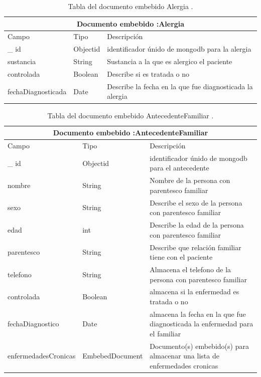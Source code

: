 	
	
\begin{table}[htb]
	\centering
	\begin{tabular}{| p{3.5cm}| p{3.0cm} | p{9.8cm} |}
	\hline
	\multicolumn{3}{|c|}{Documento embebido :Alergia} \\
	\hline
	Campo & Tipo &  Descripción\\ \hline
	
	\_ id & Objectid &identificador únido de mongodb para la alergia \\ \hline
	sustancia & String & Sustancia a la que es alergico el paciente \\ \hline
	controlada & Boolean & Describe si es tratada o no \\ \hline 
	fechaDiagnosticada & Date & Describe la fecha en la que fue diagnosticada la alergia \\ \hline

	
	\end{tabular}
	\caption{Tabla del documento embebido Alergia .}
	\label{tabla:diccionarioDatos}
	\end{table}

\begin{table}[htb]
	\centering
	\begin{tabular}{| p{3.5cm}| p{3.0cm} | p{9.8cm} |}
	\hline
	\multicolumn{3}{|c|}{Documento embebido :AntecedenteFamiliar} \\
	\hline
	Campo & Tipo &  Descripción\\ \hline
	
	\_ id & Objectid &identificador únido de mongodb para el antecedente \\ \hline
	
	nombre & String & Nombre de la persona con parentesco familiar  \\ \hline
	
	sexo &  String & Describe el sexo de la persona con parentesco familiar \\ \hline
	
	edad & int & Describe la edad de la persona con parentesco familiar \\ \hline
	
	parentesco & String & Describe que relación familiar tiene con el paciente \\ \hline
	
	telefono & String & Almacena el telefono de la persona con parentesco familiar \\ \hline
	
	controlada & Boolean & almacena si la enfermedad es tratada o no \\ \hline
	
	fechaDiagnostico & Date  & almacena la fecha en la que fue diagnosticada la enfermedad para el familiar \\ \hline
	
	enfermedadesCronicas & EmbebedDocument & Documento(s) embebido(s) para almacenar una lista de enfermedades cronicas \\ \hline
	
	\end{tabular}
	\caption{Tabla del documento embebido AntecedenteFamiliar .}
	\label{tabla:diccionarioDatos}
	\end{table}


